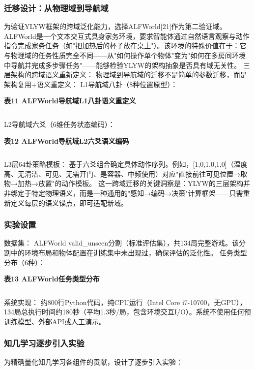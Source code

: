 \documentclass[12pt,a4paper]{article}
\begin{document}
\subsubsection{迁移设计：从物理域到导航域}
为验证YLYW框架的跨域泛化能力，选择ALFWorld[21]作为第二验证域。ALFWorld是一个文本交互式具身家务环境，要求智能体通过自然语言观察与动作指令完成家务任务（如"把加热后的杯子放在桌上"）。该环境的特殊价值在于：它与物理域的任务性质完全不同——从"如何操作单个物体"变为"如何在多房间环境中导航并完成多步骤任务"——能够检验YLYW的架构抽象是否具有域无关性。
三层架构的跨域语义重新定义：
物理域到导航域的迁移不是简单的参数迁移，而是架构复用+语义重定义：
L1导航域八卦（8种位置原型）：

\begin{center}
\textbf{表11  ALFWorld导航域L1八卦语义重定义}
\begin{tabular}{lcccc}
\hline
\end{tabular}
\end{center}
L2导航域六爻（6维任务状态编码）：

\begin{center}
\textbf{表12  ALFWorld导航域L2六爻语义编码}
\begin{tabular}{lcccc}
\hline
\end{tabular}
\end{center}
L3层64卦策略模板： 基于六爻组合确定具体动作序列。例如，[1,0,1,0,1,0]（温度高、无清洁、可见、无需开门、是容器、中频使用）对应"直接前往可见位置→取物→加热→放置"的动作模板。
这一跨域迁移的关键洞察是：YLYW的三层架构并非绑定于特定物理语义，而是一种通用的"感知→编码→决策"计算框架——只需重新定义每层的语义锚点，即可适配新域。

\subsubsection{实验设置}
数据集： ALFWorld valid\_unseen分割（标准评估集），共134局完整游戏。该分割中的环境布局和物体配置在训练集中未出现过，确保评估的泛化性。
任务类型分布（6种）：

\begin{center}
\textbf{表13  ALFWorld任务类型分布}
\begin{tabular}{lcccc}
\hline
\end{tabular}
\end{center}
系统实现： 约800行Python代码，纯CPU运行（Intel Core i7-10700，无GPU），134局总执行时间约180秒（平均1.3秒/局，包含环境交互I/O）。系统不使用任何预训练模型、外部API或人工演示。

\subsubsection{知几学习逐步引入实验}
为精确量化知几学习各组件的贡献，设计了逐步引入实验：
\end{document}
